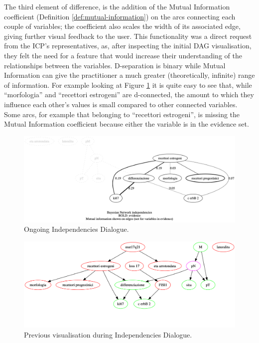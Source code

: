 The third element of difference, is the addition of the Mutual Information coefficient (Definition \ref{def:mutual-information}) on the arcs connecting each couple of variables; the coefficient also scales the width of its associated edge, giving further visual feedback to the user.
This functionality was a direct request from the ICP's representatives, as, after inspecting the initial DAG visualisation, they felt the need for a feature that would increase their understanding of the relationships between the variables.
D-separation is binary while Mutual Information can give the practitioner a much greater (theoretically, infinite) range of information.
For example looking at Figure \ref{fig:independencies_dialogue_output} it is quite easy to see that, while \enquote{morfologia} and \enquote{recettori estrogeni} are d-connected, the amount to which they influence each other's values is small compared to other connected variables.
Some arcs, for example that belonging to \enquote{recettori estrogeni}, is missing the Mutual Information coefficient because either the variable is in the evidence set.

\begin{figure}[htbp]
\centerline{\includegraphics[width=\textwidth]{results/images/independencies_dialogue_output}}
\caption{Ongoing Independencies Dialogue.}
\label{fig:independencies_dialogue_output}
\end{figure}

\begin{figure}[htbp]
\centerline{\includegraphics[width=\textwidth]{results/images/independencies_dialogue_output_old}}
\caption{Previous visualisation during Independencies Dialogue.}
\label{fig:independencies_dialogue_output_old}
\end{figure}

